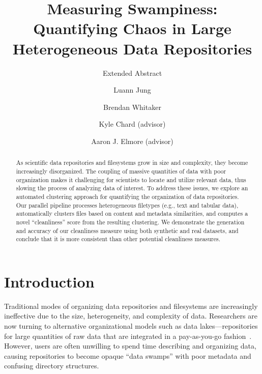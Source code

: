\documentclass[sigconf,screen]{acmart}
\begin{document}
\title{Measuring Swampiness: Quantifying Chaos in Large Heterogeneous Data Repositories}
\subtitle{Extended Abstract}

\author{Luann Jung}

\author{Brendan Whitaker}

\author{Kyle Chard (advisor)}

\author{Aaron J. Elmore (advisor)}

\renewcommand{\shortauthors}{Measuring Swampiness: Quantifying Chaos in Large Heterogeneous Data Repositories}

\begin{abstract}
As scientific data repositories and filesystems grow in size and complexity, they become increasingly disorganized. The coupling of massive quantities of data with poor organization makes it challenging for scientists to locate and utilize relevant data, thus slowing the process of analyzing data of interest. To address these issues, we explore an automated clustering approach for quantifying the organization of data repositories. Our parallel pipeline processes heterogeneous filetypes (e.g., text and tabular data), automatically clusters files based on content and metadata similarities, and computes a novel ``cleanliness'' score from the resulting clustering. We demonstrate the generation and accuracy of our cleanliness measure using both synthetic and real datasets, and conclude that it is more consistent than other potential cleanliness measures.
\end{abstract}

\maketitle

\section{Introduction}

Traditional modes of organizing data repositories and filesystems are increasingly ineffective due to the size, heterogeneity, and complexity of data. Researchers are now turning to alternative organizational models such as data lakes---repositories for large quantities of raw data that are integrated in a pay-as-you-go fashion~\cite{jeffery2008pay, madhavan2007web}. However, users are often unwilling to spend time describing and organizing data, causing repositories to become opaque ``data swamps''\cite{hai2016constance} with poor metadata and confusing directory structures. 
\end{document}
